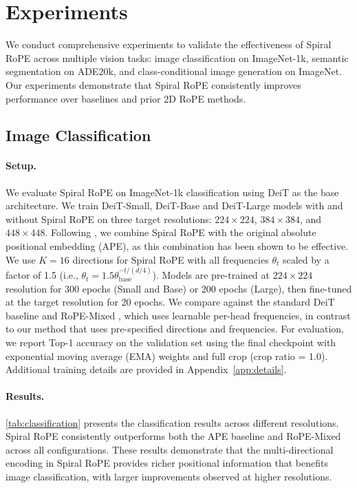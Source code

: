 
\section{Experiments}
\label{sec:experiments}

We conduct comprehensive experiments to validate the effectiveness of Spiral RoPE across multiple vision tasks: image classification on ImageNet-1k, semantic segmentation on ADE20k, and class-conditional image generation on ImageNet. Our experiments demonstrate that Spiral RoPE consistently improves performance over baselines and prior 2D RoPE methods.

\subsection{Image Classification}
\label{sec:experiments:classification}

\paragraph{Setup.} We evaluate Spiral RoPE on ImageNet-1k \cite{dengImageNetLargescaleHierarchical2009} classification using DeiT \cite{touvronTrainingDataefficientImage2021} as the base architecture. We train DeiT-Small, DeiT-Base and DeiT-Large models with and without Spiral RoPE on three target resolutions: $224 \times 224$, $384 \times 384$, and $448 \times 448$. Following \cite{heoRotaryPositionEmbedding2024}, we combine Spiral RoPE with the original absolute positional embedding (APE), as this combination has been shown to be effective. We use $K=16$ directions for Spiral RoPE with all frequencies $\theta_t$ scaled by a factor of 1.5 (i.e., $\theta_t = 1.5\theta_{\text{base}}^{-t/(d/4)}$). Models are pre-trained at $224 \times 224$ resolution for 300 epochs (Small and Base) or 200 epochs (Large), then fine-tuned at the target resolution for 20 epochs. We compare against the standard DeiT baseline and RoPE-Mixed \cite{heoRotaryPositionEmbedding2024}, which uses learnable per-head frequencies, in contrast to our method that uses pre-specified directions and frequencies. For evaluation, we report Top-1 accuracy on the validation set using the final checkpoint with exponential moving average (EMA) weights and full crop (crop ratio = 1.0). Additional training details are provided in Appendix~\ref{app:details}.

\paragraph{Results.} \cref{tab:classification} presents the classification results across different resolutions. Spiral RoPE consistently outperforms both the APE baseline and RoPE-Mixed across all configurations. These results demonstrate that the multi-directional encoding in Spiral RoPE provides richer positional information that benefits image classification, with larger improvements observed at higher resolutions.

